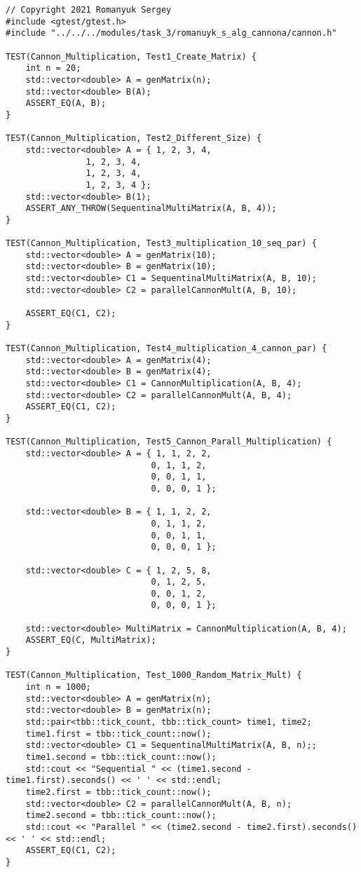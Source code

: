 \documentclass{report}
\begin{document}
\begin{lstlisting}
// Copyright 2021 Romanyuk Sergey
#include <gtest/gtest.h>
#include "../../../modules/task_3/romanuyk_s_alg_cannona/cannon.h"

TEST(Cannon_Multiplication, Test1_Create_Matrix) {
    int n = 20;
    std::vector<double> A = genMatrix(n);
    std::vector<double> B(A);
    ASSERT_EQ(A, B);
}

TEST(Cannon_Multiplication, Test2_Different_Size) {
    std::vector<double> A = { 1, 2, 3, 4,
                1, 2, 3, 4,
                1, 2, 3, 4,
                1, 2, 3, 4 };
    std::vector<double> B(1);
    ASSERT_ANY_THROW(SequentinalMultiMatrix(A, B, 4));
}

TEST(Cannon_Multiplication, Test3_multiplication_10_seq_par) {
    std::vector<double> A = genMatrix(10);
    std::vector<double> B = genMatrix(10);
    std::vector<double> C1 = SequentinalMultiMatrix(A, B, 10);
    std::vector<double> C2 = parallelCannonMult(A, B, 10);

    ASSERT_EQ(C1, C2);
}

TEST(Cannon_Multiplication, Test4_multiplication_4_cannon_par) {
    std::vector<double> A = genMatrix(4);
    std::vector<double> B = genMatrix(4);
    std::vector<double> C1 = CannonMultiplication(A, B, 4);
    std::vector<double> C2 = parallelCannonMult(A, B, 4);
    ASSERT_EQ(C1, C2);
}

TEST(Cannon_Multiplication, Test5_Cannon_Parall_Multiplication) {
    std::vector<double> A = { 1, 1, 2, 2,
                             0, 1, 1, 2,
                             0, 0, 1, 1,
                             0, 0, 0, 1 };

    std::vector<double> B = { 1, 1, 2, 2,
                             0, 1, 1, 2,
                             0, 0, 1, 1,
                             0, 0, 0, 1 };

    std::vector<double> C = { 1, 2, 5, 8,
                             0, 1, 2, 5,
                             0, 0, 1, 2,
                             0, 0, 0, 1 };

    std::vector<double> MultiMatrix = CannonMultiplication(A, B, 4);
    ASSERT_EQ(C, MultiMatrix);
}

TEST(Cannon_Multiplication, Test_1000_Random_Matrix_Mult) {
    int n = 1000;
    std::vector<double> A = genMatrix(n);
    std::vector<double> B = genMatrix(n);
    std::pair<tbb::tick_count, tbb::tick_count> time1, time2;
    time1.first = tbb::tick_count::now();
    std::vector<double> C1 = SequentinalMultiMatrix(A, B, n);;
    time1.second = tbb::tick_count::now();
    std::cout << "Sequential " << (time1.second - time1.first).seconds() << ' ' << std::endl;
    time2.first = tbb::tick_count::now();
    std::vector<double> C2 = parallelCannonMult(A, B, n);
    time2.second = tbb::tick_count::now();
    std::cout << "Parallel " << (time2.second - time2.first).seconds() << ' ' << std::endl;
    ASSERT_EQ(C1, C2);
}
\end{lstlisting}
\end{document}
